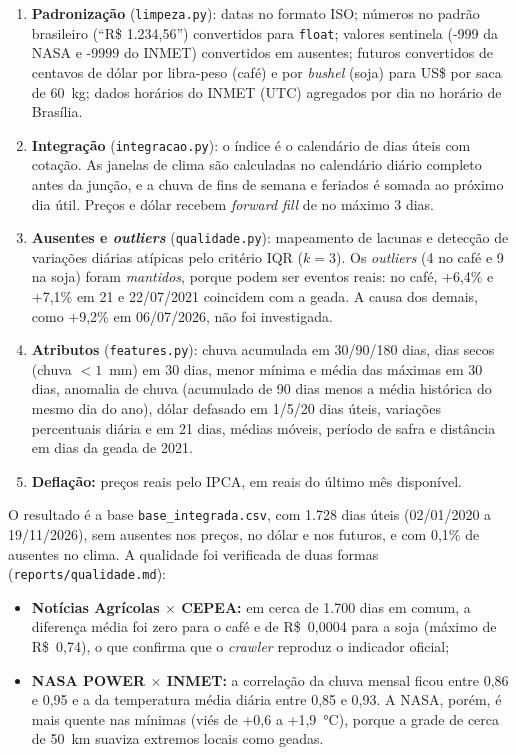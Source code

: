 \documentclass[conference]{IEEEtran}
\begin{document}
\begin{enumerate}
  \item \textbf{Padronização} (\texttt{limpeza.py}): datas no formato ISO; números no padrão brasileiro
  (``R\$ 1.234,56'') convertidos para \texttt{float}; valores sentinela (-999 da NASA e -9999 do INMET)
  convertidos em ausentes; futuros convertidos de centavos de dólar por libra-peso (café) e por \emph{bushel} (soja) para
  US\$ por saca de 60~kg; dados horários do INMET (UTC) agregados por dia no horário de Brasília.
  \item \textbf{Integração} (\texttt{integracao.py}): o índice é o calendário de dias úteis com cotação.
  As janelas de clima são calculadas no calendário diário completo antes da junção, e a chuva de fins de
  semana e feriados é somada ao próximo dia útil. Preços e dólar recebem \emph{forward fill} de no máximo
  3 dias.
  \item \textbf{Ausentes e \emph{outliers}} (\texttt{qualidade.py}): mapeamento de lacunas e detecção de
  variações diárias atípicas pelo critério IQR ($k=3$). Os \emph{outliers} (4 no café e 9 na soja) foram \emph{mantidos}, porque podem ser eventos reais: no café, +6,4\% e +7,1\% em 21 e 22/07/2021 coincidem com a geada. A causa dos demais, como +9,2\% em 06/07/2026, não foi investigada.
  \item \textbf{Atributos} (\texttt{features.py}): chuva acumulada em 30/90/180 dias, dias secos (chuva
  $<1$~mm) em 30 dias, menor mínima e média das máximas em 30 dias, anomalia de chuva (acumulado de 90 dias menos a
  média histórica do mesmo dia do ano), dólar defasado em 1/5/20 dias úteis, variações percentuais diária e em
  21 dias, médias móveis, período de safra e distância em dias da geada de 2021.
  \item \textbf{Deflação:} preços reais pelo IPCA, em reais do último mês disponível.
\end{enumerate}

O resultado é a base \texttt{base\_integrada.csv}, com 1.728 dias úteis (02/01/2020 a 19/11/2026),
sem ausentes nos preços, no dólar e nos futuros, e com 0,1\% de ausentes no clima. A
qualidade foi verificada de duas formas (\texttt{reports/qualidade.md}):
\begin{itemize}
  \item \textbf{Notícias Agrícolas $\times$ CEPEA:} em cerca de 1.700 dias em comum, a diferença
  média foi zero para o café e de R\$~0,0004 para a soja (máximo de R\$~0,74), o que confirma que o
  \emph{crawler} reproduz o indicador oficial;
  \item \textbf{NASA POWER $\times$ INMET:} a correlação da chuva mensal ficou entre 0,86 e 0,95 e a da
  temperatura média diária entre 0,85 e 0,93. A NASA, porém, é mais quente nas mínimas (viés de
  +0,6 a +1,9~°C), porque a grade de cerca de 50~km suaviza extremos locais como geadas.
\end{itemize}
\end{document}
